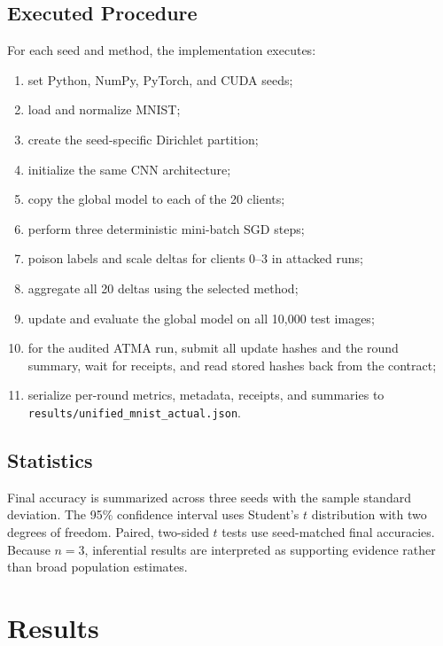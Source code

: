 \documentclass[10pt,letterpaper]{article}
\begin{document}
\subsection{Executed Procedure}

For each seed and method, the implementation executes:
\begin{enumerate}[leftmargin=*]
    \item set Python, NumPy, PyTorch, and CUDA seeds;
    \item load and normalize MNIST;
    \item create the seed-specific Dirichlet partition;
    \item initialize the same CNN architecture;
    \item copy the global model to each of the 20 clients;
    \item perform three deterministic mini-batch SGD steps;
    \item poison labels and scale deltas for clients 0--3 in attacked runs;
    \item aggregate all 20 deltas using the selected method;
    \item update and evaluate the global model on all 10,000 test images;
    \item for the audited ATMA run, submit all update hashes and the round
    summary, wait for receipts, and read stored hashes back from the contract;
    \item serialize per-round metrics, metadata, receipts, and summaries to
    \texttt{results/unified\_mnist\_actual.json}.
\end{enumerate}

\subsection{Statistics}

Final accuracy is summarized across three seeds with the sample standard
deviation. The 95\% confidence interval uses Student's $t$ distribution with
two degrees of freedom. Paired, two-sided $t$ tests use seed-matched final
accuracies. Because $n=3$, inferential results are interpreted as supporting
evidence rather than broad population estimates.

\section{Results}


\end{document}
